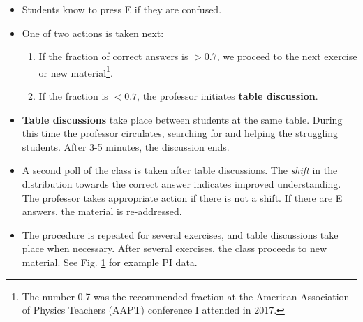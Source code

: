 \documentclass[../../../main.tex]{subfiles}
\begin{document}
\begin{itemize}
\begin{figure}
\caption{\label{fig:exampleData} (Left) An answer distribution of my 25-student PHYS135A class (A was correct).  This distribution triggered a table discussion.  One student pressed E (indicating confusion) and I took appropriate action.  (Right) After table discussions, the students responded and the fraction of correct answers was 22/25 = 0.88.}
\end{figure}
\item Students know to press E if they are confused.
\item One of two actions is taken next:
\begin{enumerate}
\item If the fraction of correct answers is $>0.7$, we proceed to the next exercise or new material\footnote{The number 0.7 was the recommended fraction at the American Association of Physics Teachers (AAPT) conference I attended in 2017.}.
\item If the fraction is $<0.7$, the professor initiates \textbf{table discussion}.
\end{enumerate}
\item \textbf{Table discussions} take place between students at the same table.  During this time the professor circulates, searching for and helping the struggling students.  After 3-5 minutes, the discussion ends.
\item A second poll of the class is taken after table discussions.  The \textit{shift} in the distribution towards the correct answer indicates improved understanding.  The professor takes appropriate action if there is not a shift.  If there are E answers, the material is re-addressed.
\item The procedure is repeated for several exercises, and table discussions take place when necessary.  After several exercises, the class proceeds to new material. See Fig. \ref{fig:exampleData} for example PI data.
\end{itemize}
\end{document}
